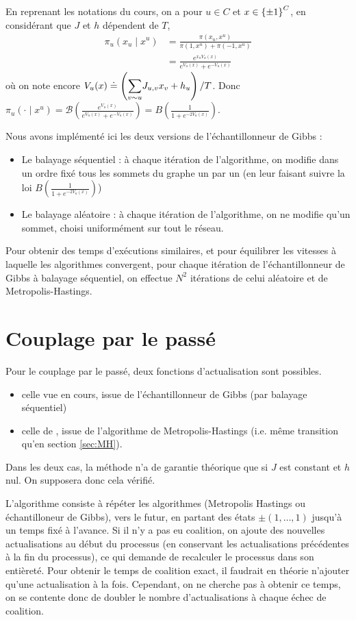 \documentclass[a4paper,11pt]{article}
\begin{document}
En reprenant les notations du cours, on a pour $u \in C$ et $x \in \left\lbrace \pm 1 \right\rbrace^C$, en considérant que $J$ et $h$ dépendent de $T$,
\begin{align*}
\pi_u(x_u \mid x^u)
&= \frac{\pi(x_u,x^u)}{\pi(1,x^u) + \pi(-1,x^u)}\\
&= \frac{e^{x_u V_u(x)}}{e^{V_u(x)} + e^{-V_u(x)}}
\end{align*}
où on note encore $V_u(x) \doteq \left( \displaystyle{\sum_{v \sim u}^{}} J_{u,v} x_v + h_u \right) /T$. Donc $\pi_u(\cdot \mid x^u) = \mathcal B(\frac{e^{V_u(x)}}{e^{V_u(x)} + e^{-V_u(x)}}) = B(\frac{1}{1 + e^{-2V_u(x)}})$.

Nous avons implémenté ici les deux versions de l'échantillonneur de Gibbs :
\begin{itemize}
	\item Le balayage séquentiel : à chaque itération de l'algorithme, on modifie dans un ordre fixé tous les sommets du graphe un par un (en leur faisant suivre la loi $B(\frac{1}{1 + e^{-2V_u(x)}})$)
	\item Le balayage aléatoire : à chaque itération de l'algorithme, on ne modifie qu'un sommet, choisi uniformément sur tout le réseau.
\end{itemize}
Pour obtenir des temps d'exécutions similaires, et pour équilibrer les vitesses à laquelle les algorithmes convergent, pour chaque itération de l'échantillonneur de Gibbs à balayage séquentiel, on effectue $N^2$ itérations de celui aléatoire et de Metropolis-Hastings.

\section{Couplage par le passé}\label{sec:coupling}

Pour le couplage par le passé, deux fonctions d'actualisation sont possibles. 
\begin{itemize}
	\item celle vue en cours, issue de l'échantillonneur de Gibbs (par balayage séquentiel)
	\item celle de \cite{propp1998coupling}, issue de l'algorithme de Metropolis-Hastings (i.e. même transition qu'en section \ref{sec:MH}).
\end{itemize}
Dans les deux cas, la méthode n'a de garantie théorique que si $J$ est constant et $h$ nul. On supposera donc cela vérifié.

L'algorithme consiste à répéter les algorithmes (Metropolis Hastings ou échantilloneur de Gibbs), vers le futur, en partant des états $\pm(1,\hdots,1)$  jusqu'à un temps fixé à l'avance. Si il n'y a pas eu coalition, on ajoute des nouvelles actualisations au début du processus (en conservant les actualisations précédentes à la fin du processus), ce qui demande de recalculer le processus dans son entièreté. Pour obtenir le temps de coalition exact, il faudrait en théorie n'ajouter qu'une actualisation à la fois. Cependant, on ne cherche pas à obtenir ce temps, on se contente donc de doubler le nombre d'actualisations à chaque échec de coalition.
\end{document}
